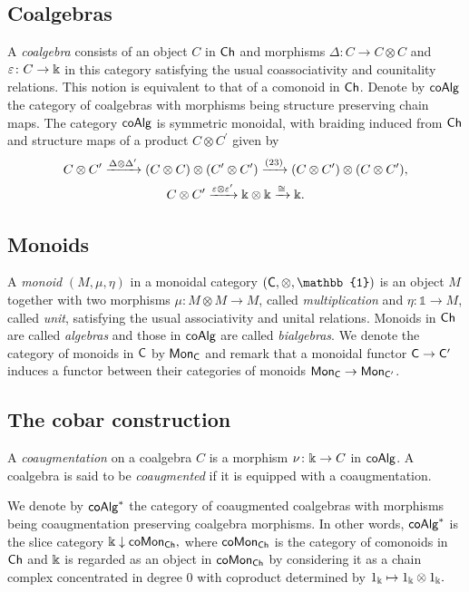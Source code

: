 \subsection{Coalgebras} \label{ss:coalgebras}

A \textit{coalgebra} consists of an object $C$ in $\mathsf{Ch}$ and morphisms $\Delta \colon C \to C \otimes C$ and $\varepsilon \colon C \to \Bbbk$ in this category satisfying the usual coassociativity and counitality relations.
This notion is equivalent to that of a comonoid in $\mathsf{Ch}$.
Denote by $\mathsf{coAlg}$ the category of coalgebras with morphisms being structure preserving chain maps.
The category $\mathsf{coAlg}$ is symmetric monoidal, with braiding induced from $\mathsf{Ch}$ and structure maps of a product $C \otimes C^\prime$ given by
\begin{gather*}
C \otimes C^\prime \xrightarrow{\Delta \otimes \Delta^\prime}
(C \otimes C) \otimes (C^\prime \otimes C^\prime) \xrightarrow{(23)}
(C \otimes C^\prime) \otimes (C \otimes C^\prime), \\
C \otimes C^\prime \xrightarrow{\varepsilon \otimes \varepsilon^\prime}
\Bbbk \otimes \Bbbk \xrightarrow{\cong} \Bbbk.
\end{gather*}

\subsection{Monoids}

A \textit{monoid} $(M, \mu, \eta)$ in a monoidal category $(\sC, \otimes, \mathbb{1})$ is an object $M$ together with two morphisms $\mu \colon M \otimes M \to M$, called \textit{multiplication} and $\eta \colon \mathbb{1} \to M$, called \textit{unit}, satisfying the usual associativity and unital relations.
Monoids in $\mathsf{Ch}$ are called \textit{algebras} and those in $\mathsf{coAlg}$ are called \textit{bialgebras}.
We denote the category of monoids in $\mathsf{C}$ by $\mathsf{Mon}_{\mathsf{C}}$ and remark that a monoidal functor $\mathsf{C} \to \mathsf{C}^\prime$ induces a functor between their categories of monoids $\mathsf{Mon}_{\mathsf{C}} \to \mathsf{Mon}_{\mathsf{C}^\prime}$.

\subsection{The cobar construction} \label{ss:cobar construction}

A \textit{coaugmentation} on a coalgebra $C$ is a morphism $\nu \colon \Bbbk \to C$ in $\mathsf{coAlg}$.
A coalgebra is said to be \textit{coaugmented} if it is equipped with a coaugmentation.

We denote by $\mathsf{coAlg}^\ast$ the category of coaugmented coalgebras with morphisms being coaugmentation preserving coalgebra morphisms. In other words, $\mathsf{coAlg}^\ast$ is the slice category $\Bbbk \downarrow \mathsf{coMon}_{\mathsf{Ch}},$ where $\mathsf{coMon}_{\mathsf{Ch}}$ is the category of comonoids in $\mathsf{Ch}$ and $\Bbbk$ is regarded as an object in $\mathsf{coMon}_{\mathsf{Ch}}$ by considering it as a chain complex concentrated in degree $0$ with coproduct determined by $1_{\Bbbk} \mapsto 1_{\Bbbk} \otimes 1_{\Bbbk}.$

